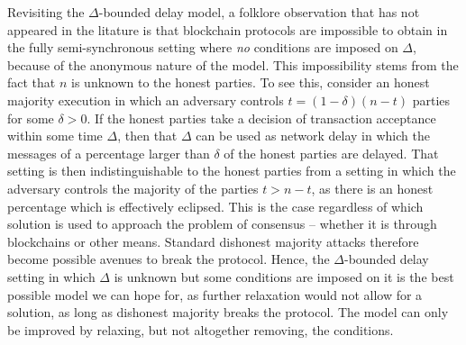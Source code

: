 \begin{remark}
Revisiting the $\Delta$-bounded delay model, a folklore observation that has not appeared in
the litature is that blockchain protocols are impossible to obtain in the fully
semi-synchronous setting where \emph{no} conditions are imposed on $\Delta$,
because of the anonymous nature of the model. This impossibility stems from the
fact that $n$ is unknown to the honest parties. To see this, consider an
honest majority execution in which an adversary controls $t = (1 - \delta)(n -
t)$ parties for some $\delta > 0$. If the honest parties take a decision of
transaction acceptance within some time $\Delta$, then that $\Delta$ can be used
as network delay in which the messages of a percentage larger than $\delta$ of
the honest parties are delayed. That setting is then indistinguishable to the
honest parties from a setting in which the adversary controls the majority of
the parties $t > n - t$, as there is an honest percentage which is effectively
eclipsed. This is the case regardless of which solution is used to approach the
problem of consensus -- whether it is through blockchains or other means.
Standard dishonest majority attacks therefore become possible avenues to break
the protocol. Hence, the $\Delta$-bounded delay setting in which $\Delta$ is
unknown but some conditions are imposed on it is the best possible model we can
hope for, as further relaxation would not allow for a solution, as long as
dishonest majority breaks the protocol. The model can only be improved by
relaxing, but not altogether removing, the conditions.
\end{remark}

